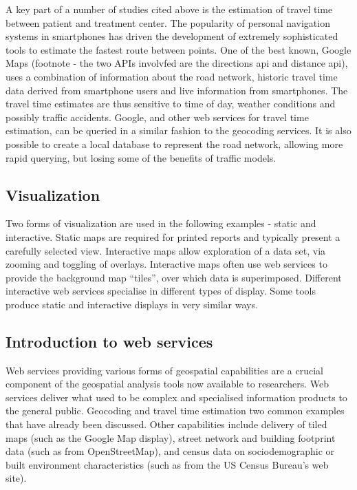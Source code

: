 \documentclass[]{article}
\begin{document}
A key part of a number of studies cited above is the estimation of
travel time between patient and treatment center. The popularity of
personal navigation systems in smartphones has driven the development of
extremely sophisticated tools to estimate the fastest route between
points. One of the best known, Google Maps (footnote - the two APIs
involvfed are the directions api and distance api), uses a combination
of information about the road network, historic travel time data derived
from smartphone users and live information from smartphones. The travel
time estimates are thus sensitive to time of day, weather conditions and
possibly traffic accidents. Google, and other web services for travel
time estimation, can be queried in a similar fashion to the geocoding
services. It is also possible to create a local database to represent
the road network, allowing more rapid querying, but losing some of the
benefits of traffic models.

\hypertarget{visualization}{%
\subsection{Visualization}\label{visualization}}

Two forms of visualization are used in the following examples - static
and interactive. Static maps are required for printed reports and
typically present a carefully selected view. Interactive maps allow
exploration of a data set, via zooming and toggling of overlays.
Interactive maps often use web services to provide the background map
``tiles'', over which data is superimposed. Different interactive web
services specialise in different types of display. Some tools produce
static and interactive displays in very similar ways.

\hypertarget{introduction-to-web-services}{%
\subsection{Introduction to web
services}\label{introduction-to-web-services}}

Web services providing various forms of geospatial capabilities are a
crucial component of the geospatial analysis tools now available to
researchers. Web services deliver what used to be complex and
specialised information products to the general public. Geocoding and
travel time estimation two common examples that have already been
discussed. Other capabilities include delivery of tiled maps (such as
the Google Map display), street network and building footprint data
(such as from OpenStreetMap), and census data on sociodemographic or
built environment characteristics (such as from the US Census Bureau's
web site).
\end{document}
